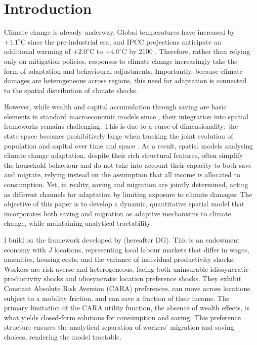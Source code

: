 \documentclass[11pt, a4paper]{article}
\begin{document}
\section{Introduction}

Climate change is already underway. Global temperatures have increased by $+1.1^\circ\text{C}$ since the pre-industrial era, and IPCC projections anticipate an additional warming of $+2.0^\circ\text{C}$ to $+4.0^\circ\text{C}$ by 2100 \citep{lee_ipcc_2023}. Therefore, rather than relying only on mitigation policies, responses to climate change increasingly take the form of adaptation and behavioural adjustments. Importantly, because climate damages are heterogeneous across regions, this need for adaptation is connected to the spatial distribution of climate shocks.

However, while wealth and capital accumulation through saving are basic elements in standard macroeconomic models since \citet{solow_contribution_1956}, their integration into spatial frameworks remains challenging. This is due to a curse of dimensionality: the state space becomes prohibitively large when tracking the joint evolution of population and capital over time and space \citep{desmet_spatial_2025}. As a result, spatial models analysing climate change adaptation, despite their rich structural features, often simplify the household behaviour and do not take into account their capacity to both save and migrate, relying instead on the assumption that all income is allocated to consumption. Yet, in reality, saving and migration are jointly determined, acting as different channels for adaptation by limiting exposure to climate damages. The objective of this paper is to develop a dynamic, quantitative spatial model that incorporates both saving and migration as adaptive mechanisms to climate change, while maintaining analytical tractability.

I build on the framework developed by \citet{dvorkin_geography_2025} (hereafter DG). This is an endowment economy with $J$ locations, representing local labour markets that differ in wages, amenities, housing costs, and the variance of individual productivity shocks. Workers are risk-averse and heterogeneous, facing both uninsurable idiosyncratic productivity shocks and idiosyncratic location preference shocks. They exhibit Constant Absolute Risk Aversion (CARA) preferences, can move across locations subject to a mobility friction, and can save a fraction of their income. The primary limitation of the CARA utility function, the absence of wealth effects, is what yields closed-form solutions for consumption and saving. This preference structure ensures the analytical separation of workers' migration and saving choices, rendering the model tractable.
\end{document}
